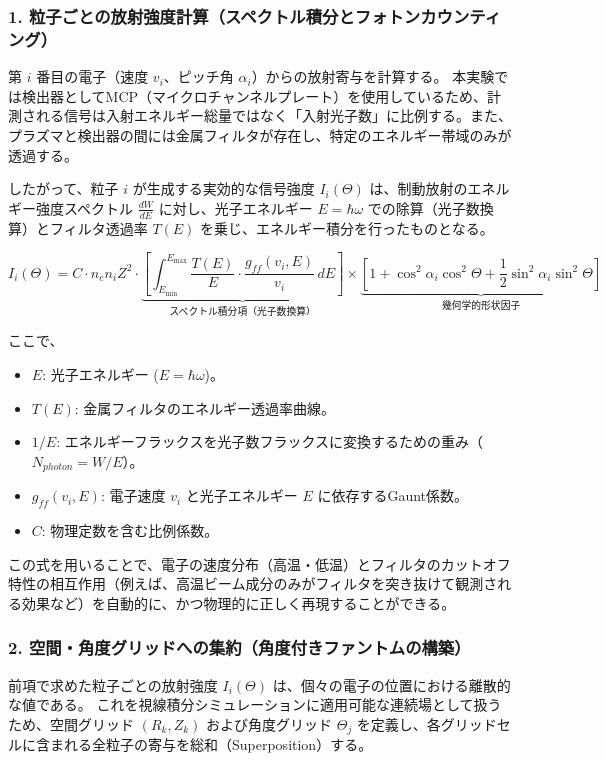 \documentclass[a4paper,11pt]{bxjsarticle} %
\begin{document}
\subsubsection{1. 粒子ごとの放射強度計算（スペクトル積分とフォトンカウンティング）}
第 $i$ 番目の電子（速度 $v_i$、ピッチ角 $\alpha_i$）からの放射寄与を計算する。
本実験では検出器としてMCP（マイクロチャンネルプレート）を使用しているため、計測される信号は入射エネルギー総量ではなく「入射光子数」に比例する。また、プラズマと検出器の間には金属フィルタが存在し、特定のエネルギー帯域のみが透過する。

したがって、粒子 $i$ が生成する実効的な信号強度 $I_i(\Theta)$ は、制動放射のエネルギー強度スペクトル $\frac{dW}{dE}$ に対し、光子エネルギー $E = \hbar\omega$ での除算（光子数換算）とフィルタ透過率 $T(E)$ を乗じ、エネルギー積分を行ったものとなる。

\begin{equation}
    I_i(\Theta) = C \cdot n_e n_i Z^2 \cdot \underbrace{\left[ \int_{E_{\min}}^{E_{\max}} \frac{T(E)}{E} \cdot \frac{g_{ff}(v_i, E)}{v_i} \, dE \right]}_{\text{スペクトル積分項（光子数換算）}} \times \underbrace{\left[ 1 + \cos^2\alpha_i \cos^2\Theta + \frac{1}{2}\sin^2\alpha_i \sin^2\Theta \right]}_{\text{幾何学的形状因子}}
\end{equation}

ここで、
\begin{itemize}
    \item $E$: 光子エネルギー ($E = \hbar\omega$)。
    \item $T(E)$: 金属フィルタのエネルギー透過率曲線。
    \item $1/E$: エネルギーフラックスを光子数フラックスに変換するための重み（$N_{photon} = W / E$）。
    \item $g_{ff}(v_i, E)$: 電子速度 $v_i$ と光子エネルギー $E$ に依存するGaunt係数。
    \item $C$: 物理定数を含む比例係数。
\end{itemize}

この式を用いることで、電子の速度分布（高温・低温）とフィルタのカットオフ特性の相互作用（例えば、高温ビーム成分のみがフィルタを突き抜けて観測される効果など）を自動的に、かつ物理的に正しく再現することができる。

\subsubsection{2. 空間・角度グリッドへの集約（角度付きファントムの構築）}

前項で求めた粒子ごとの放射強度 $I_i(\Theta)$ は、個々の電子の位置における離散的な値である。
これを視線積分シミュレーションに適用可能な連続場として扱うため、空間グリッド $(R_k, Z_k)$ および角度グリッド $\Theta_j$ を定義し、各グリッドセルに含まれる全粒子の寄与を総和（Superposition）する。
\end{document}

